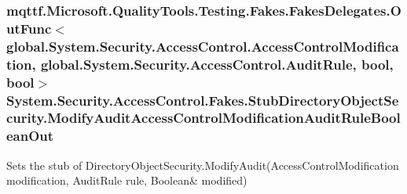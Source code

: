 \hypertarget{class_system_1_1_security_1_1_access_control_1_1_fakes_1_1_stub_directory_object_security_a593a0f2163482e808d00fa83bb298b93}{
\subsubsection[{Modify\-Audit\-Access\-Control\-Modification\-Audit\-Rule\-Boolean\-Out}]{\setlength{\rightskip}{0pt plus 5cm}mqttf.\-Microsoft.\-Quality\-Tools.\-Testing.\-Fakes.\-Fakes\-Delegates.\-Out\-Func$<$global.\-System.\-Security.\-Access\-Control.\-Access\-Control\-Modification, global.\-System.\-Security.\-Access\-Control.\-Audit\-Rule, bool, bool$>$ System.\-Security.\-Access\-Control.\-Fakes.\-Stub\-Directory\-Object\-Security.\-Modify\-Audit\-Access\-Control\-Modification\-Audit\-Rule\-Boolean\-Out}}\label{class_system_1_1_security_1_1_access_control_1_1_fakes_1_1_stub_directory_object_security_a593a0f2163482e808d00fa83bb298b93}


Sets the stub of Directory\-Object\-Security.\-Modify\-Audit(Access\-Control\-Modification modification, Audit\-Rule rule, Boolean\& modified)

